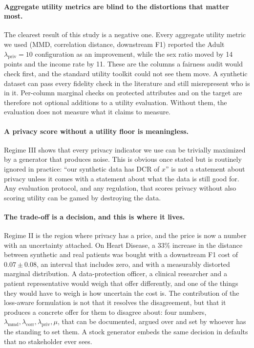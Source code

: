 \documentclass[11pt,a4paper]{article}
\newcommand{\lmmd}{\lambda_{\text{mmd}}}
\newcommand{\lcorr}{\lambda_{\text{corr}}}
\newcommand{\lpriv}{\lambda_{\text{priv}}}
\begin{document}
\paragraph{Aggregate utility metrics are blind to the distortions that matter
most.}
The clearest result of this study is a negative one. Every aggregate utility
metric we used (MMD, correlation distance, downstream F1) reported the Adult
$\lpriv = 10$ configuration as an improvement, while the sex ratio moved by 14
points and the income rate by 11. These are the columns a fairness audit would
check first, and the standard utility toolkit could not see them move. A
synthetic dataset can pass every fidelity check in the literature and still
misrepresent who is in it. Per-column marginal checks on protected attributes
and on the target are therefore not optional additions to a utility
evaluation. Without them, the evaluation does not measure what it claims to
measure.

\paragraph{A privacy score without a utility floor is meaningless.}
Regime III shows that every privacy indicator we use can be trivially
maximized by a generator that produces noise. This is obvious once stated but
is routinely ignored in practice: ``our synthetic data has DCR of $x$'' is not
a statement about privacy unless it comes with a statement about what the data
is still good for. Any evaluation protocol, and any regulation, that scores
privacy without also scoring utility can be gamed by destroying the data.

\paragraph{The trade-off is a decision, and this is where it lives.}
Regime II is the region where privacy has a price, and the price is now a
number with an uncertainty attached. On Heart Disease, a 33\% increase in the
distance between synthetic and real patients was bought with a downstream F1
cost of $0.07 \pm 0.08$, an interval that includes zero, and with a
measurably distorted marginal distribution. A data-protection officer, a
clinical researcher and a patient representative would weigh that offer
differently, and one of the things they would have to weigh is how uncertain
the cost is. The contribution of the loss-aware formulation is not that it
resolves the disagreement, but that it produces a concrete offer for them to
disagree about: four numbers, $\lmmd, \lcorr, \lpriv, \mu$, that can be
documented, argued over and set by whoever has the standing to set them. A
stock generator embeds the same decision in defaults that no stakeholder ever
sees.
\end{document}
